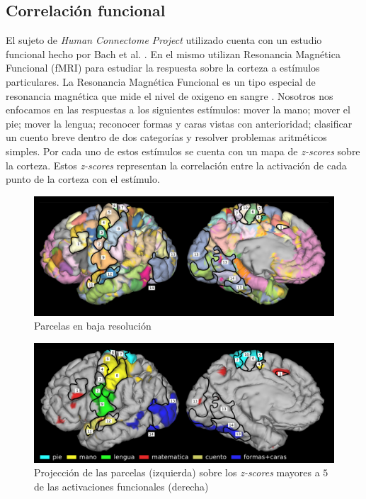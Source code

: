 \subsection{Correlaci\'on funcional}
\label{sec:corr_funcional}

El sujeto de \textit{Human Connectome Project} utilizado cuenta con un 
estudio funcional hecho por Bach et al. \cite{Barch2013}. En el mismo
utilizan Resonancia Magn\'etica Funcional (fMRI) para estudiar la
respuesta sobre la corteza a est\'imulos particulares. La Resonancia 
Magn\'etica Funcional es un tipo especial de resonancia magn\'etica que
mide el nivel de oxigeno en sangre \cite{Ogawa1990}. Nosotros nos
enfocamos en las respuestas a los siguientes est\'imulos: mover la mano;
mover el pie; mover la lengua; reconocer formas y caras vistas con
anterioridad; clasificar un cuento breve dentro de dos categor\'ias y
resolver problemas aritm\'eticos simples. Por cada uno de estos
est\'imulos se cuenta con un mapa de \textit{z-scores} sobre la corteza.
Estos \textit{z-scores} representan la correlaci\'on entre la activaci\'on
de cada punto de la corteza con el est\'imulo. \\

\begin{figure}[h!]
    \includegraphics[width=\textwidth]{img/32k_labels.png}
    \caption{Parcelas en baja resoluci\'on}
    \label{fig:32k}
\end{figure}


\begin{figure}[h!]
    \includegraphics[width=\textwidth]{img/32k_z5.png}
    \caption{Projecci\'on de las parcelas (izquierda) sobre los \textit{z-scores}
    mayores a $5$ de las activaciones funcionales (derecha)}
    \label{fig:32k_z5}
\end{figure}

